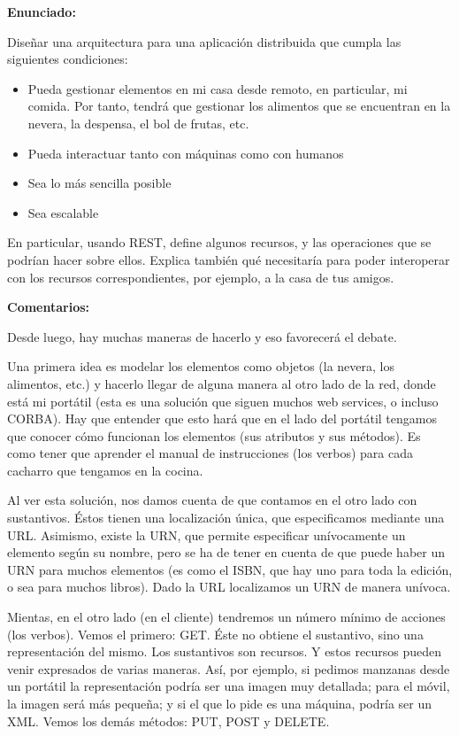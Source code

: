 \textbf{Enunciado:}

Diseñar una arquitectura para una aplicación distribuida que cumpla las siguientes condiciones:

\begin{itemize}
\item Pueda gestionar elementos en mi casa desde remoto, en particular, mi comida. Por tanto, tendrá que gestionar los alimentos que se encuentran en la nevera, la despensa, el bol de frutas, etc.
\item Pueda interactuar tanto con máquinas como con humanos
\item Sea lo más sencilla posible
\item Sea escalable
\end{itemize}

En particular, usando REST, define algunos recursos, y las operaciones que se podrían hacer sobre ellos. Explica también qué necesitaría para poder interoperar con los recursos correspondientes, por ejemplo, a la casa de tus amigos.

\textbf{Comentarios:}

Desde luego, hay muchas maneras de hacerlo y eso favorecerá el debate.

Una primera idea es modelar los elementos como objetos (la nevera, los alimentos, etc.) y hacerlo llegar de alguna manera al otro lado de la red, donde está mi portátil (esta es una solución que siguen muchos web services, o incluso CORBA). Hay que entender que esto hará que en el lado del portátil tengamos que conocer cómo funcionan los elementos (sus atributos y sus métodos). Es como tener que aprender el manual de instrucciones (los verbos) para cada cacharro que tengamos en la cocina.

Al ver esta solución, nos damos cuenta de que contamos en el otro lado con sustantivos. Éstos tienen una localización única, que especificamos mediante una URL. Asimismo, existe la URN, que permite especificar unívocamente un elemento según su nombre, pero se ha de tener en cuenta de que puede haber un URN para muchos elementos (es como el ISBN, que hay uno para toda la edición, o sea para muchos libros). Dado la URL localizamos un URN de manera unívoca.

Mientas, en el otro lado (en el cliente) tendremos un número mínimo de acciones (los verbos). Vemos el primero: GET. Éste no obtiene el sustantivo, sino una representación del mismo. Los sustantivos son recursos. Y estos recursos pueden venir expresados de varias maneras. Así, por ejemplo, si pedimos manzanas desde un portátil la representación podría ser una imagen muy detallada; para el móvil, la imagen será más pequeña; y si el que lo pide es una máquina, podría ser un XML. Vemos los demás métodos: PUT, POST y DELETE.


